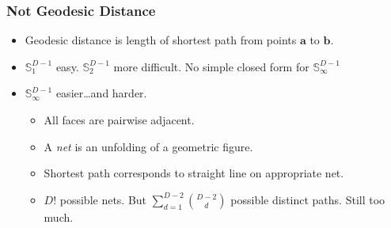 \documentclass[aspectratio=169,10pt]{beamer}
\begin{document}
\begin{frame}
    \frametitle{Not Geodesic Distance}
    \label{pgpareto:notgeodesic}
    \begin{itemize}
        \item Geodesic distance is length of shortest path from points $\bm{a}$ to $\bm{b}$.
        \item $\mathbb{S}_1^{D-1}$ easy.  $\mathbb{S}_2^{D-1}$ more difficult. 
            No simple closed form for $\mathbb{S}_{\infty}^{D-1}$
        \item $\mathbb{S}_{\infty}^{D-1}$ easier\ldots and harder.
        \begin{itemize}
            \item All faces are pairwise adjacent.
            \item A \emph{net} is an unfolding of a geometric figure.  
            \item Shortest path corresponds to straight line on appropriate net.
            \item $D!$ possible nets.  But $\sum_{d = 1}^{D-2}\binom{D-2}{d}$ 
                possible distinct paths.  Still too much.
        \end{itemize}
    \end{itemize}
    \hyperlink{pgpareto:energyscore}{}
\end{frame} %
\end{document}
